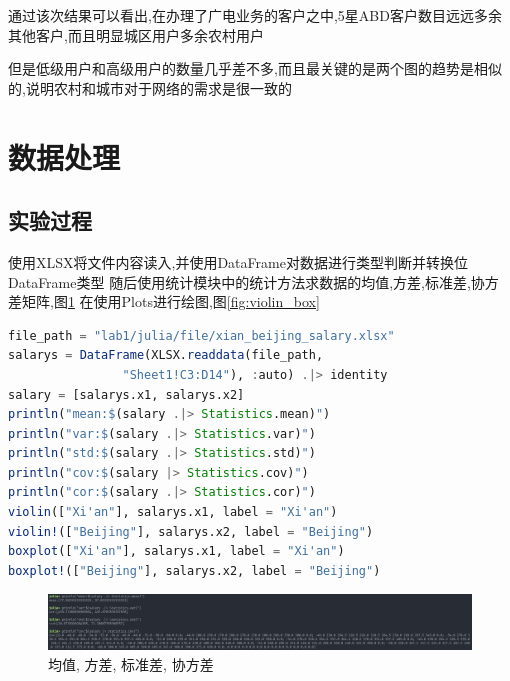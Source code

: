 \documentclass[a4paper]{article}
\begin{document}
通过该次结果可以看出,在办理了广电业务的客户之中,5星ABD客户数目远远多余其他客户,而且明显城区用户多余农村用户

但是低级用户和高级用户的数量几乎差不多,而且最关键的是两个图的趋势是相似的,说明农村和城市对于网络的需求是很一致的

\newpage

\section{数据处理}\label{sub:process}
\subsection{实验过程} \label{sub:process-lab}

使用XLSX将文件内容读入,并使用DataFrame对数据进行类型判断并转换位DataFrame类型
随后使用统计模块中的统计方法求数据的均值,方差,标准差,协方差矩阵,图\ref{fig:mean}
在使用Plots进行绘图,图\ref{fig:violin_box}
\begin{lstlisting}[language=julia]
file_path = "lab1/julia/file/xian_beijing_salary.xlsx"
salarys = DataFrame(XLSX.readdata(file_path, 
                "Sheet1!C3:D14"), :auto) .|> identity
salary = [salarys.x1, salarys.x2]
println("mean:$(salary .|> Statistics.mean)")
println("var:$(salary .|> Statistics.var)")
println("std:$(salary .|> Statistics.std)")
println("cov:$(salary |> Statistics.cov)")
println("cor:$(salary .|> Statistics.cor)")
violin(["Xi'an"], salarys.x1, label = "Xi'an")
violin!(["Beijing"], salarys.x2, label = "Beijing")
boxplot(["Xi'an"], salarys.x1, label = "Xi'an")
boxplot!(["Beijing"], salarys.x2, label = "Beijing")
\end{lstlisting}

\begin{figure}[h]
    \centering
    \includegraphics[width=12cm]{images/数据处理.png}
    \caption{均值, 方差, 标准差, 协方差}
    \label{fig:mean}
\end{figure}
\end{document}

